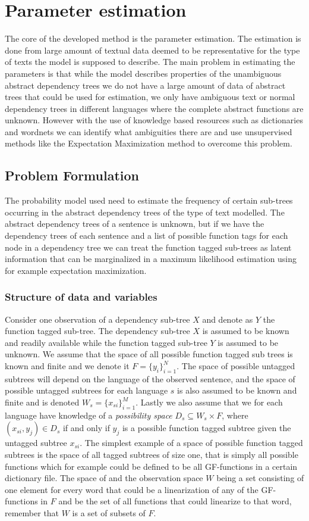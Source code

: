 \section{Parameter estimation}
The core of the developed method is the parameter estimation. The estimation is done from large amount of textual data deemed to be representative for the type of texts the model is supposed to describe. The main problem in estimating the parameters is that while the model describes properties of the unambiguous abstract dependency trees we do not have a large amount of data of abstract trees that could be used for estimation, we only have ambiguous text or normal dependency trees in different languages where the complete abstract functions are unknown. However with the use of knowledge based resources such as dictionaries and wordnets we can identify what ambiguities there are and use unsupervised methods like the Expectation Maximization method to overcome this problem.
\subsection{Problem Formulation}
The probability model used need to estimate the frequency of certain sub-trees occurring in the abstract dependency trees of the type of text modelled. The abstract dependency trees of a sentence is unknown, but if we have the dependency trees of each sentence and a list of possible function tags for each node in a dependency tree we can treat the function tagged sub-trees as latent information that can be marginalized in a maximum likelihood estimation using for example expectation maximization.
\subsubsection{Structure of data and variables}
Consider one observation of a dependency sub-tree $X$ and denote as $Y$ the function tagged sub-tree. The dependency sub-tree $X$ is assumed to be known and readily available while the function tagged sub-tree $Y$ is assumed to be unknown. We assume that the space of all possible function tagged sub trees is known and finite and we denote it $F=\{y_i\}_{i=1}^N$. The space of possible untagged subtrees will depend on the language of the observed sentence, and the space of possible untagged subtrees for each language $s$ is also assumed to be known and finite and is denoted $W_s=\{x_{si}\}_{i=1}^M$. Lastly we also assume that we for each language have knowledge of a \emph{possibility space} $D_s\subseteq W_s \times F$, where $(x_{si},y_j)\in D_s$ if and only if $y_j$ is a possible function tagged subtree given the untagged subtree $x_{si}$. The simplest example of a space of possible function tagged subtrees is the space of all tagged subtrees of size one, that is simply all possible functions which for example could be defined to be all GF-functions in a certain dictionary file. The space of  and the observation space $W$ being a set consisting of one element for every word that could be a linearization of any of the GF-functions in $F$ and be the set of all functions that could linearize to that word, remember that $W$ is a set of subsets of $F$.
